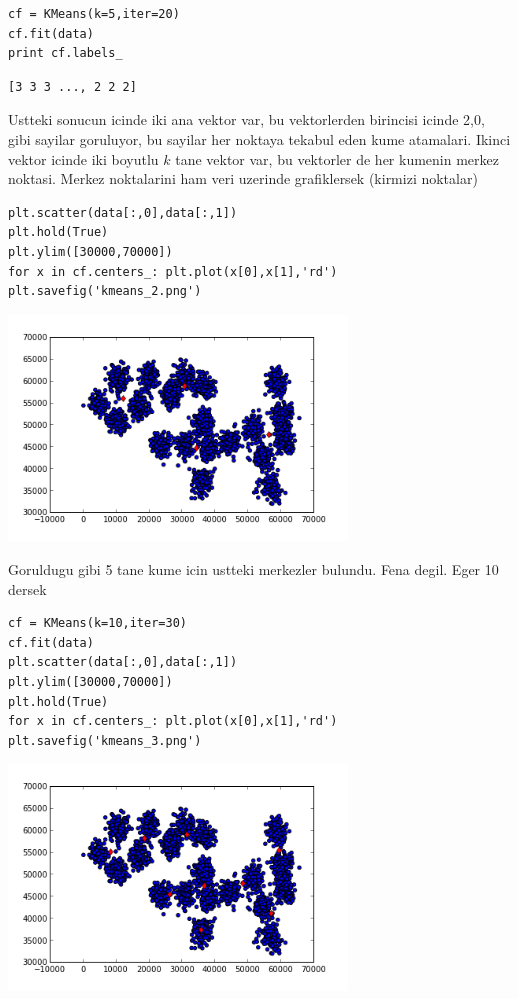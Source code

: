 \documentclass[12pt,fleqn]{article}\usepackage{../common}
\begin{document}
\begin{verbatim}
cf = KMeans(k=5,iter=20)
cf.fit(data)
print cf.labels_
\end{verbatim}

\begin{verbatim}
[3 3 3 ..., 2 2 2]
\end{verbatim}

Ustteki sonucun icinde iki ana vektor var, bu vektorlerden birincisi icinde
2,0, gibi sayilar goruluyor, bu sayilar her noktaya tekabul eden kume
atamalari.  Ikinci vektor icinde iki boyutlu $k$ tane vektor var, bu
vektorler de her kumenin merkez noktasi. Merkez noktalarini ham veri
uzerinde grafiklersek (kirmizi noktalar)

\begin{verbatim}
plt.scatter(data[:,0],data[:,1])
plt.hold(True)
plt.ylim([30000,70000])
for x in cf.centers_: plt.plot(x[0],x[1],'rd')
plt.savefig('kmeans_2.png')
\end{verbatim}

\includegraphics[height=6cm]{kmeans_2.png}

Goruldugu gibi 5 tane kume icin ustteki merkezler bulundu. Fena
degil. Eger 10 dersek

\begin{verbatim}
cf = KMeans(k=10,iter=30)
cf.fit(data)
plt.scatter(data[:,0],data[:,1])
plt.ylim([30000,70000])
plt.hold(True)
for x in cf.centers_: plt.plot(x[0],x[1],'rd')
plt.savefig('kmeans_3.png')
\end{verbatim}

\includegraphics[height=6cm]{kmeans_3.png}
\end{document}
